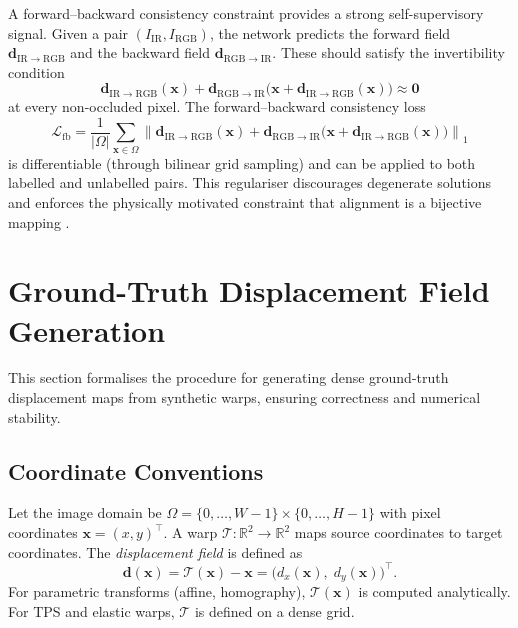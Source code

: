 A forward--backward consistency constraint provides a strong self-supervisory
signal.  Given a pair $(I_{\mathrm{IR}}, I_{\mathrm{RGB}})$, the network
predicts the forward field $\mathbf{d}_{\mathrm{IR} \to \mathrm{RGB}}$ and
the backward field $\mathbf{d}_{\mathrm{RGB} \to \mathrm{IR}}$.  These
should satisfy the invertibility condition
\begin{equation}
    \mathbf{d}_{\mathrm{IR} \to \mathrm{RGB}}(\mathbf{x})
    + \mathbf{d}_{\mathrm{RGB} \to \mathrm{IR}}\!\bigl(\mathbf{x} +
      \mathbf{d}_{\mathrm{IR} \to \mathrm{RGB}}(\mathbf{x})\bigr)
    \approx \mathbf{0}
    \label{eq:fb_consistency}
\end{equation}
at every non-occluded pixel.  The forward--backward consistency loss
\begin{equation}
    \mathcal{L}_{\mathrm{fb}} =
    \frac{1}{|\Omega|}\sum_{\mathbf{x} \in \Omega}
    \left\| \mathbf{d}_{\mathrm{IR} \to \mathrm{RGB}}(\mathbf{x})
    + \mathbf{d}_{\mathrm{RGB} \to \mathrm{IR}}\!\bigl(\mathbf{x} +
      \mathbf{d}_{\mathrm{IR} \to \mathrm{RGB}}(\mathbf{x})\bigr)
    \right\|_1
    \label{eq:fb_loss}
\end{equation}
is differentiable (through bilinear grid sampling) and can be applied to both
labelled and unlabelled pairs.  This regulariser discourages degenerate
solutions and enforces the physically motivated constraint that alignment is a
bijective mapping \cite{meister2018unflow, jonschkowski2020matters}.


\section{Ground-Truth Displacement Field Generation}
\label{sec:gt_displacement}

This section formalises the procedure for generating dense ground-truth
displacement maps from synthetic warps, ensuring correctness and numerical
stability.

\subsection{Coordinate Conventions}
\label{subsec:coordinates}

Let the image domain be $\Omega = \{0, \ldots, W\!-\!1\} \times
\{0, \ldots, H\!-\!1\}$ with pixel coordinates
$\mathbf{x} = (x, y)^{\top}$.  A warp $\mathcal{T}: \mathbb{R}^2 \to
\mathbb{R}^2$ maps source coordinates to target coordinates.  The
\emph{displacement field} is defined as
\begin{equation}
    \mathbf{d}(\mathbf{x}) = \mathcal{T}(\mathbf{x}) - \mathbf{x}
    = \bigl( d_x(\mathbf{x}),\; d_y(\mathbf{x}) \bigr)^{\top}.
    \label{eq:displacement}
\end{equation}
For parametric transforms (affine, homography), $\mathcal{T}(\mathbf{x})$ is
computed analytically.  For TPS and elastic warps, $\mathcal{T}$ is defined on
a dense grid.

